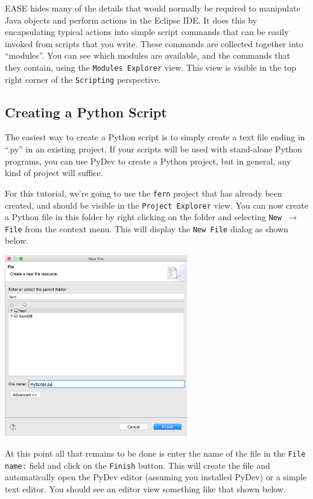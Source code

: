 EASE hides many of the details that would normally be required to manipulate
Java objects and perform actions in the Eclipse IDE. It does this by
encapsulating typical actions into simple script commands that can be easily
invoked from scripts that you write. These commands are collected together into
``modules''. You can see which modules are available, and the commands that they
contain, using the \texttt{Modules Explorer} view. This view is visible in
the top right corner of the \texttt{Scripting} perspective. 

\subsection{Creating a Python Script}

The easiest way to create a Python script is to simply create a text file ending
in ``.py'' in an existing project. If your scripts will be used with stand-alone Python
programs, you can use PyDev to create a Python project, but in general, any kind
of project will suffice.

For this tutorial, we're going to use the \texttt{fern} project that has
already been created, and should be visible in the \texttt{Project Explorer}
view. You can now create a Python file in this folder by right clicking on the
folder and selecting \texttt{New $\rightarrow$ File} from the context menu. 
This will display the \texttt{New File} dialog as shown below.

\begin{center} \includegraphics[width=8cm]{images/newfile}
\end{center}

At this point all that remains to be done is enter the name of the file in the
\texttt{File name:} field and click on the \texttt{Finish} button. This will
create the file and automatically open the PyDev editor (assuming you installed
PyDev) or a simple text editor. You should see an editor view something like
that shown below.

